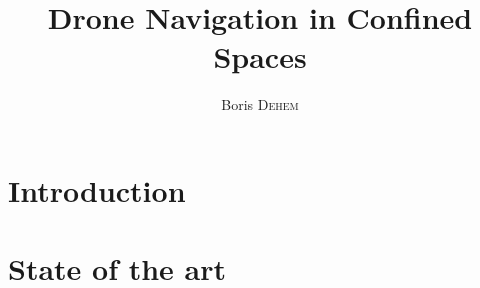 \documentclass{eplmastersthesis}
\title{Drone Navigation in Confined Spaces}
\author{Boris \textsc{Dehem}}
\begin{document}








\printglossaries

\chapter{Introduction}


\chapter{State of the art}


%

%
\end{document}
